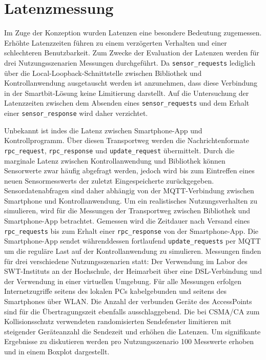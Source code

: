 \documentclass[11pt,a4paper]{report}
\begin{document}
\section{Latenzmessung}
Im Zuge der Konzeption wurden Latenzen eine besondere Bedeutung zugemessen.
Erhöhte Latenzzeiten führen zu einem verzögerten Verhalten und einer schlechteren Benutzbarkeit.
Zum Zwecke der Evaluation der Latenzen werden für drei Nutzungsszenarien Messungen durchgeführt.
Da \texttt{sensor\_requests} lediglich über die Local-Loopback-Schnittstelle zwischen Bibliothek und Kontrollanwendung ausgetauscht werden ist anzunehmen, dass diese Verbindung in der Smartbit-Lösung keine Limitierung darstellt.
Auf die Untersuchung der Latenzzeiten zwischen dem Absenden eines \texttt{sensor\_requests} und dem Erhalt einer \texttt{sensor\_response} wird daher verzichtet.

Unbekannt ist indes die Latenz zwischen Smartphone-App und Kontrollprogramm.
Über diesen Transportweg werden die Nachrichtenformate \texttt{rpc\_request}, \texttt{rpc\_re\-sponse} und \texttt{update\_request} übermittelt.
Durch die marginale Latenz zwischen Kontrollanwendung und Bibliothek können Sensorwerte zwar häufig abgefragt werden, jedoch wird bis zum Eintreffen eines neuen Sensormesswerts der zuletzt Eingespeicherte zurückgegeben.
Sensordatenabfragen sind daher abhängig von der MQTT-Verbindung zwischen Smartphone und Kontrollanwendung.
Um ein realistisches Nutzungsverhalten zu simulieren, wird für die Messungen der Transportweg zwischen Bibliothek und Smartphone-App betrachtet.
Gemessen wird die Zeitdauer nach Versand eines \texttt{rpc\_requests} bis zum Erhalt einer \texttt{rpc\_response} von der Smartphone-App.
Die Smartphone-App sendet währenddessen fortlaufend \texttt{update\_requests} per MQTT um die reguläre Last auf der Kontrollanwendung zu simulieren.
Messungen finden für drei verschiedene Nutzungsszenarien statt: Der Verwendung im Labor des SWT-Instituts an der Hochschule, der Heimarbeit über eine DSL-Verbindung und der Verwendung in einer virtuellen Umgebung.
Für alle Messungen erfolgen Internetzugriffe seitens des lokalen PCs kabelgebunden und seitens des Smartphones über WLAN.
Die Anzahl der verbunden Geräte des AccessPoints sind für die Übertragungszeit ebenfalls ausschlaggebend.
Die bei CSMA/CA zum Kollisionsschutz verwendeten randomisierten Sendefenster limitieren mit steigender Geräteanzahl die Sendezeit und erhöhen die Latenzen.
Um signifikante Ergebnisse zu diskutieren werden pro Nutzungsszenario 100 Messwerte erhoben und in einem Boxplot dargestellt.
\end{document}
